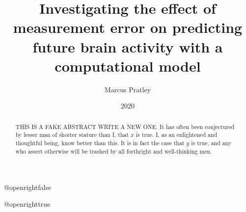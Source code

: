 \documentclass[10.5pt,twoside,openright]{report}
\title{Investigating the effect of measurement error on predicting future brain
activity with a computational model}
\author{Marcus Pratley}
\date{2020}
\begin{document}
\csname @openrightfalse\endcsname

\maketitle

\declaration

\dedication{With thanks to Frances Hutchins and Prof. Marcus Kaiser, who have both been a great help throughout the somewhat fraught process of creating this dissertation. \\ \vspace{1ex} Extra thanks also to my family, and parents in particular, for all their love and support over the course of my degree. }

\begin{abstract}
  THIS IS A FAKE ABSTRACT WRITE A NEW ONE. It has often been conjectured by lesser man of shorter stature than I, that
  $x$ is true. I, as an enlightened and thoughtful being, know better than
  this. It is in fact the case that $y$ is true, and any who assert otherwise
  will be trashed by all forthright and well-thinking men.
\end{abstract}

\def\table{\def\figurename{Table}\figure}
\let\endtable\endfigure
\renewcommand\listfigurename{List of Figures and Tables}

\tableofcontents
\listoffigures
\csname @openrighttrue\endcsname








\printbibliography[heading=bibintoc]
\end{document}
